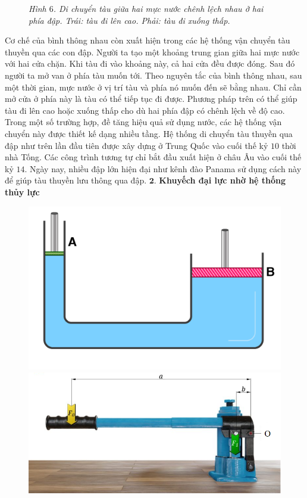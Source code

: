 \begin{multicols}{2}
\begin{figure}[H]
		\caption{\small\textit{\color{timhieukhoahoc}Hình $6$. Di chuyển tàu giữa hai mực nước chênh lệch nhau ở hai phía đập. Trái: tàu đi lên cao. Phải: tàu đi xuống thấp.}}
		\vspace*{-10pt}
	\end{figure}
	Cơ chế của bình thông nhau còn xuất hiện trong các hệ thống vận chuyển tàu thuyền qua các con đập. Người ta tạo một khoảng trung gian giữa hai mực nước với hai cửa chặn. Khi tàu đi vào khoảng này, cả hai cửa đều được đóng. Sau đó người ta mở van ở phía tàu muốn tới. Theo nguyên tắc của bình thông nhau, sau một thời gian, mực nước ở vị trí tàu và phía nó muốn đến sẽ bằng nhau. Chỉ cần mở cửa ở phía này là tàu có thể tiếp tục đi được. Phương pháp trên có thể giúp tàu đi lên cao hoặc xuống thấp cho dù hai phía đập có chênh lệch về độ cao. Trong một số trường hợp, đề tăng hiệu quả sử dụng nước, các hệ thống vận chuyển này được thiết kế dạng nhiều tầng. 
	\vskip 0.1cm
	Hệ thống di chuyển tàu thuyền qua đập như trên lần đầu tiên được xây dựng ở Trung Quốc vào cuối thế kỷ $10$ thời nhà Tống. Các công trình tương tự chỉ bắt đầu xuất hiện ở châu Âu vào cuối thế kỷ $14$. Ngày nay, nhiều đập lớn hiện đại như kênh đào Panama sử dụng cách này để giúp tàu thuyền lưu thông qua đập. 
	\vskip 0.1cm
	$\pmb{2.}$ \textbf{\color{timhieukhoahoc}Khuyếch đại lực nhờ hệ thống thủy lực}
	\begin{figure}[H]
		\vspace*{-5pt}
		\centering
		\captionsetup{labelformat= empty, justification=centering}
		\includegraphics[width= 1\linewidth]{13}
		\includegraphics[width= 1\linewidth]{14}

\end{figure}
\end{multicols}
